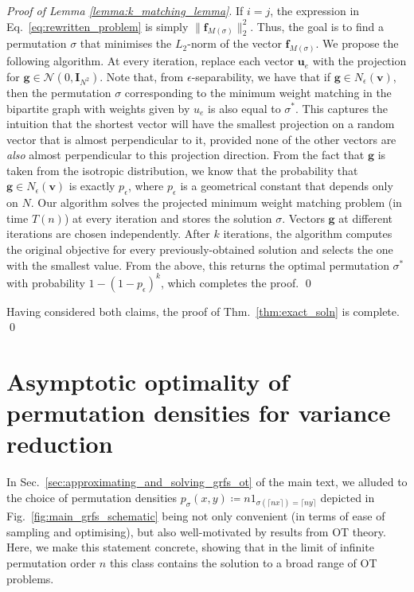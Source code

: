 \emph{Proof of Lemma \ref{lemma:k_matching_lemma}}.
If $i=j$, the expression in Eq.~\ref{eq:rewritten_problem} is simply $\|\mathbf{f}_{M(\sigma)}\|_{2}^{2}$.
Thus, the goal is to find a permutation $\sigma$ that minimises the $L_2$-norm of the vector $\mathbf{f}_{M(\sigma)}$. 
We propose the following algorithm.
At every iteration, replace each vector $\mathbf{u}_{e}$ with the projection  for $\mathbf{g} \in \mathcal{N}(0,\mathbf{I}_{N^2})$. %
Note that, from $\epsilon$-separability, we have that if $\mathbf{g} \in N_{\epsilon}(\mathbf{v})$, then the permutation $\sigma$ corresponding to the minimum weight matching in the bipartite graph with weights given by $u_{e}$ is also equal to $\sigma^{*}$. 
This captures the intuition that the shortest vector will have the smallest projection on a random vector that is almost perpendicular to it, provided none of the other vectors are \emph{also} almost perpendicular to this projection direction.
From the fact that $\mathbf{g}$ is taken from the isotropic distribution, we know that the probability that $\mathbf{g} \in N_{\epsilon}(\mathbf{v})$ is exactly $p_{\epsilon}$, where $p_{\epsilon}$ is a geometrical constant that depends only on $N$.
Our algorithm solves the projected minimum weight matching problem (in time $T(n)$) at every iteration and stores the solution $\sigma$. 
Vectors $\mathbf{g}$ at different iterations are chosen independently. 
After $k$ iterations, the algorithm computes the original objective for every previously-obtained solution and selects the one with the smallest value. 
From the above, this returns the optimal permutation $\sigma^{*}$ with probability $1-(1-p_{\epsilon})^{k}$, which completes the proof. \qed

Having considered both claims, the proof of Thm.~\ref{thm:exact_soln} is complete. \qed


\section{Asymptotic optimality of permutation densities for variance reduction} \label{app:discrete_ot_theory}
In Sec.~\ref{sec:approximating_and_solving_grfs_ot} of the main text, we alluded to the choice of permutation densities $ p_\sigma(x,y) \coloneqq n 1_{\sigma(\lceil nx \rceil) = \lceil ny \rceil}$ depicted in Fig.~\ref{fig:main_grfs_schematic} being not only convenient (in terms of ease of sampling and optimising), but also well-motivated by results from OT theory. 
Here, we make this statement concrete, showing that in the limit of infinite permutation order $n$ this class contains the solution to a broad range of OT problems.

